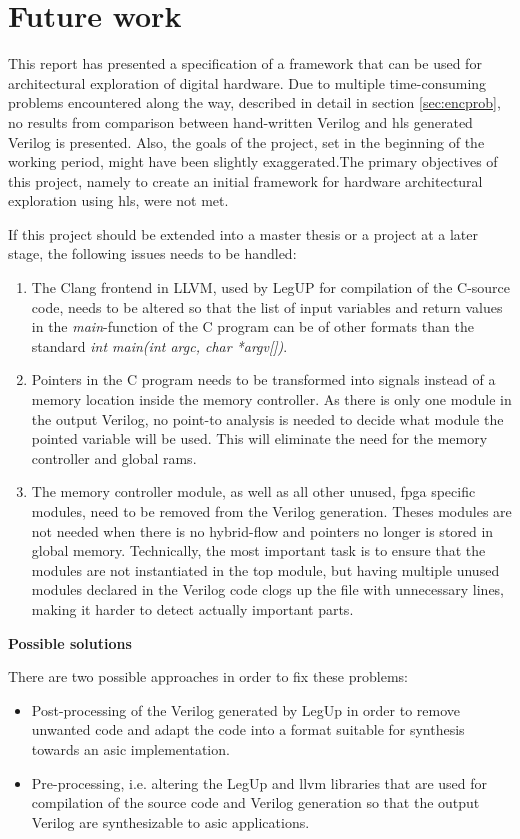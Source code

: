 \chapter{Future work}
\label{chp:futurework} 
This report has presented a specification of a framework that can be used for architectural exploration of digital hardware. Due to multiple time-consuming problems encountered along the way, described in detail in section \ref{sec:encprob}, no results from comparison between hand-written Verilog and \gls{hls} generated Verilog is presented. Also, the goals of the project, set in the beginning of the working period, might have been slightly exaggerated.The primary objectives of this project, namely to create an initial framework for hardware architectural exploration using \gls{hls}, were not met.

If this project should be extended into a master thesis or a project at a later stage, the following issues needs to be handled:
\begin{enumerate}\label{enum:futworkprob}
    \item \label{item:futworkprob}The Clang frontend in LLVM, used by LegUP for compilation of the C-source code, needs to be altered so that the list of input variables and return values in the \textit{main}-function of the C program can be of other formats than the standard \textit{int main(int argc, char *argv[])}.
    \item Pointers in the C program needs to be transformed into signals instead of a memory location inside the memory controller. As there is only one module in the output Verilog, no point-to analysis is needed to decide what module the pointed variable will be used. This will eliminate the need for the memory controller and global \gls{ram}s.
    \item The memory controller module, as well as all other unused, \gls{fpga} specific modules, need to be removed from the Verilog generation. Theses modules are not needed when there is no hybrid-flow and pointers no longer is stored in global memory. Technically, the most important task is to ensure that the modules are not instantiated in the top module, but having multiple unused modules declared in the Verilog code clogs up the file with unnecessary lines, making it harder to detect actually important parts.
\end{enumerate}

\textbf{Possible solutions}

\noindent
There are two possible approaches in order to fix these problems:
\begin{itemize}
\item Post-processing of the Verilog generated by LegUp in order to remove unwanted code and adapt the code into a format suitable for synthesis towards an \gls{asic} implementation.
\item Pre-processing, i.e. altering the LegUp and \gls{llvm} libraries that are used for compilation of the source code and Verilog generation so that the output Verilog are synthesizable to \gls{asic} applications.
\end{itemize}



